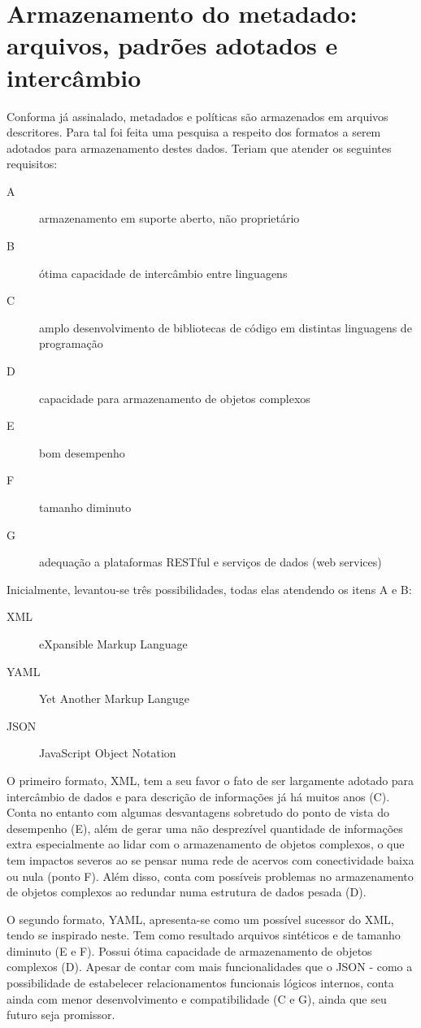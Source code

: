 \section{Armazenamento do metadado: arquivos, padrões adotados e intercâmbio}
Conforma já assinalado, metadados e políticas são armazenados em
arquivos descritores. Para tal foi feita uma pesquisa a respeito dos
formatos a serem adotados para armazenamento destes dados. Teriam que
atender os seguintes requisitos:
\begin{description}
\item[A] armazenamento em suporte aberto, não proprietário
\item[B] ótima capacidade de intercâmbio entre linguagens
\item[C] amplo desenvolvimento de bibliotecas de código em distintas linguagens de programação
\item[D] capacidade para armazenamento de objetos complexos
\item[E] bom desempenho
\item[F] tamanho diminuto
\item[G] adequação a plataformas RESTful e serviços de dados (web services)
\end{description}

Inicialmente, levantou-se três possibilidades, todas elas atendendo os itens A e B:
\begin{description}
\item[XML] eXpansible Markup Language
\item[YAML] Yet Another Markup Languge
\item[JSON] JavaScript Object Notation
\end{description}

O primeiro formato, XML, tem a seu favor o fato de ser largamente
adotado para intercâmbio de dados e para descrição de informações já
há muitos anos (C). Conta no entanto com algumas desvantagens
sobretudo do ponto de vista do desempenho (E), além de gerar uma não
desprezível quantidade de informações extra especialmente ao lidar com
o armazenamento de objetos complexos, o que tem impactos severos ao se
pensar numa rede de acervos com conectividade baixa ou nula (ponto
F). Além disso, conta com possíveis problemas no armazenamento de
objetos complexos ao redundar numa estrutura de dados pesada (D).

O segundo formato, YAML, apresenta-se como um possível sucessor do
XML, tendo se inspirado neste. Tem como resultado arquivos sintéticos
e de tamanho diminuto (E e F). Possui ótima capacidade de
armazenamento de objetos complexos (D). Apesar de contar com mais
funcionalidades que o JSON - como a possibilidade de estabelecer
relacionamentos funcionais lógicos internos, conta ainda com menor
desenvolvimento e compatibilidade (C e G), ainda que seu futuro seja
promissor.

